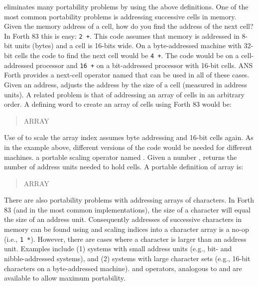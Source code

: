  eliminates many portability problems by using the above
definitions. One of the most common portability problems is addressing
successive cells in memory. Given the memory address of a cell, how
do you find the address of the next cell? In Forth 83 this is easy:
\texttt{2 +}. This code assumes that memory is addressed in 8-bit
units (bytes) and a cell is 16-bits wide. On a byte-addressed machine
with 32-bit cells the code to find the next cell would be \texttt{4 +}.
The code would be  on a cell-addressed processor and
\texttt{16 +} on a bit-addressed processor with 16-bit cells. ANS Forth
provides a next-cell operator named  that can be used in
all of these cases. Given an address,  adjusts the address
by the size of a cell (measured in address units). A related problem
is that of addressing an array of cells in an arbitrary order. A
defining word to create an array of cells using Forth 83 would be:
\begin{quote}\ttfamily
	\word{:} ARRAY ~  ~   ~
		   \word{+} \word{;}
\end{quote}
Use of  to scale the array index assumes byte addressing and
16-bit cells again. As in the example above, different versions of
the code would be needed for different machines. 
a portable scaling operator named . Given a number ,
 returns the number of address units needed to hold 
cells. A portable definition of array is:
\begin{quote}\ttfamily
	\word{:} ARRAY ~  ~   \\
	\hspace*{2em}   \word{+} \word{;}
\end{quote}
There are also portability problems with addressing arrays of
characters. In Forth 83 (and in the most common 
implementations), the size of a character will equal the size of an
address unit. Consequently addresses of successive characters in
memory can be found using  and scaling indices into a character
array is a no-op (i.e., \texttt{1 *}). However, there are cases where
a character is larger than an address unit. Examples include (1)
systems with small address units (e.g., bit- and nibble-addressed
systems), and (2) systems with large character sets (e.g., 16-bit
characters on a byte-addressed machine).  and 
operators, analogous to  and  are available
to allow maximum portability.

